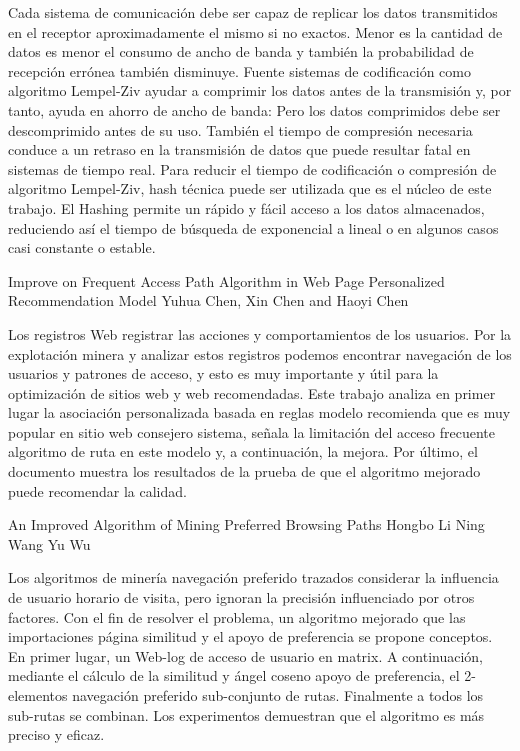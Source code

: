 Cada sistema de comunicación debe ser capaz de replicar los datos transmitidos en el receptor aproximadamente el mismo si no exactos. Menor es la cantidad de datos es menor el consumo de ancho de banda y también la probabilidad de recepción errónea también disminuye. Fuente sistemas de codificación como algoritmo Lempel-Ziv ayudar a comprimir los datos antes de la transmisión y, por tanto, ayuda en ahorro de ancho de banda: Pero los datos comprimidos debe ser descomprimido antes de su uso. También el tiempo de compresión necesaria conduce a un retraso en la transmisión de datos que puede resultar fatal en sistemas de tiempo real.
Para reducir el tiempo de codificación o compresión de algoritmo Lempel-Ziv, hash técnica puede ser utilizada que es el núcleo de este trabajo. El Hashing permite un rápido y fácil acceso a los datos almacenados, reduciendo así el tiempo de búsqueda de exponencial a lineal o en algunos casos casi constante o estable.


Improve on Frequent Access Path Algorithm in Web Page Personalized Recommendation Model
Yuhua Chen, Xin Chen and Haoyi Chen

Los registros Web registrar las acciones y comportamientos de los usuarios. Por la explotación minera y analizar estos registros podemos encontrar navegación de los usuarios y patrones de acceso, y esto es muy importante y útil para la optimización de sitios web y web recomendadas. Este trabajo analiza en primer lugar la asociación personalizada basada en reglas modelo recomienda que es muy popular en sitio web consejero sistema, señala la limitación del acceso frecuente algoritmo de ruta en este modelo y, a continuación, la mejora. Por último, el documento muestra los resultados de la prueba de que el algoritmo mejorado puede recomendar la calidad.



An Improved Algorithm of Mining Preferred Browsing Paths
Hongbo Li
Ning Wang
Yu Wu

Los algoritmos de minería navegación preferido trazados considerar la influencia de usuario horario de visita, pero ignoran la precisión influenciado por otros factores. Con el fin de resolver el problema, un algoritmo mejorado que las importaciones página similitud y el apoyo de preferencia se propone conceptos. En primer lugar, un Web-log de acceso de usuario en matrix. A continuación, mediante el cálculo de la similitud y ángel coseno apoyo de preferencia, el 2-elementos navegación preferido sub-conjunto de rutas. Finalmente a todos los sub-rutas se combinan. Los experimentos demuestran que el algoritmo es más preciso y eficaz.


